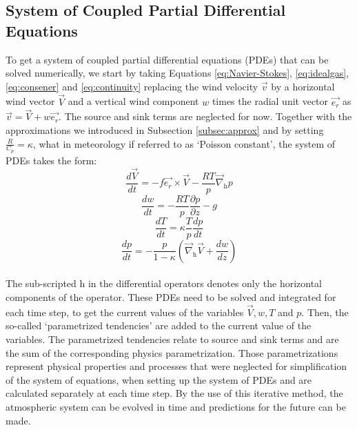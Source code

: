 \subsection{System of Coupled Partial Differential Equations}
To get a system of coupled partial differential equations (PDEs) that can be solved numerically, we start by taking Equations \eqref{eq:Navier-Stokes}, \eqref{eq:idealgas}, \eqref{eq:consener} and \eqref{eq:continuity} replacing the wind velocity $\vec{v}$ by a horizontal wind vector $ \vec{V} $ and a vertical wind component $w$ times the radial unit vector $\vec{e_{r}}$ as $\vec{v} = \vec{V} + w \vec{e_{r}} $. The source and sink terms are neglected for now.
Together with the approximations we introduced in Subsection \ref{subsec:approx} and by setting $\frac{R}{C_{p}}=\kappa$, what in meteorology if referred to as `Poisson constant', the system of PDEs  takes the form:
\vspace{1cm}
\begin{equation}
    \frac{d\vec{V}}{dt} = -f \vec{e_{r}} \times \vec{V} - \frac{RT}{p}\vec{\nabla}_{\mathrm{h}} p
\end{equation}
\begin{equation}
   \frac{dw}{dt} = - \frac{RT}{p} \frac{\partial p}{\partial z} -g 
\end{equation}
\begin{equation}
    \frac{dT}{dt} = \kappa \frac{T}{p}\frac{d p}{d t}
\end{equation}
\begin{equation}
    \frac{dp}{dt} = - \frac{p}{ 1 - \kappa} \left( \vec{\nabla}_{\mathrm{h}} \vec{V} + \frac{dw}{dz} \right)
\end{equation}
\vspace{1cm}\\
The sub-scripted h in the differential operators denotes only the horizontal components of the operator.
These PDEs need to be solved and integrated for each time step, to get the  current values of the variables $\vec{V}, w, T$ and $ p$. Then, the so-called `parametrized tendencies' are added to the current value of the variables. The parametrized tendencies relate to source and sink terms and are the sum of the corresponding physics parametrization. Those parametrizations represent physical properties and processes that were neglected for simplification of the system of equations, when setting up the system of PDEs and are calculated separately at each time step. By the use of this iterative method, the atmospheric system can be evolved in time and predictions for the future can be made.\\
